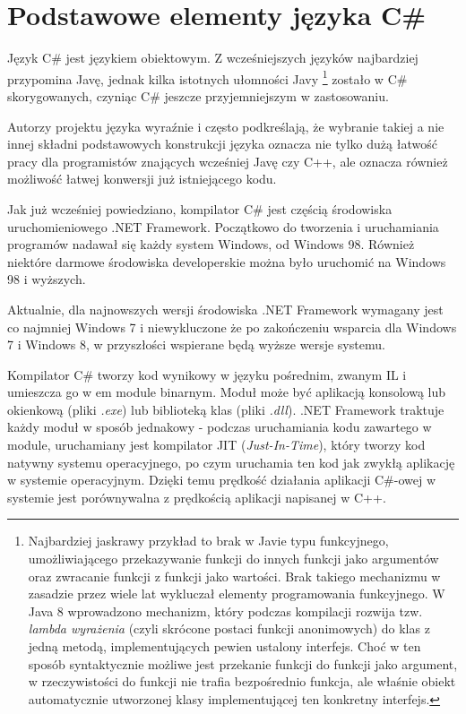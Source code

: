﻿\section{Podstawowe elementy języka C\#}

Język C\# jest językiem obiektowym. Z wcześniejszych języków najbardziej przypomina Javę, jednak
kilka istotnych ułomności Javy
\footnote{Najbardziej jaskrawy przykład to brak w Javie typu funkcyjnego, umożliwiającego przekazywanie
funkcji do innych funkcji jako argumentów oraz zwracanie funkcji z funkcji jako wartości. Brak takiego mechanizmu
w zasadzie przez wiele lat wykluczał elementy programowania funkcyjnego. W Java 8 wprowadzono mechanizm, który
podczas kompilacji rozwija tzw. {\em lambda wyrażenia} (czyli skrócone postaci funkcji anonimowych) do 
klas z jedną metodą, implementujących pewien ustalony interfejs. Choć w ten sposób syntaktycznie możliwe jest przekanie
funkcji do funkcji jako argument, w rzeczywistości do funkcji nie trafia bezpośrednio funkcja, ale właśnie
obiekt automatycznie utworzonej klasy implementującej ten konkretny interfejs.} 
zostało w C\# skorygowanych, czyniąc C\# jeszcze przyjemniejszym w zastosowaniu.

Autorzy projektu języka wyraźnie i często podkreślają, że wybranie takiej a nie innej składni 
podstawowych konstrukcji języka oznacza nie tylko dużą łatwość pracy dla programistów znających 
wcześniej Javę czy C++, ale oznacza również możliwość łatwej konwersji już istniejącego 
kodu.

Jak już wcześniej powiedziano, kompilator C\# jest częścią środowiska uruchomieniowego .NET Framework. 
Początkowo do tworzenia i uruchamiania programów nadawał się każdy system Windows, od Windows 98. Również
niektóre darmowe środowiska developerskie można było uruchomić na Windows 98 i wyższych. 

Aktualnie, dla najnowszych wersji środowiska .NET Framework wymagany jest co najmniej Windows 7 i niewykluczone
że po zakończeniu wsparcia dla Windows 7 i Windows 8, w przyszłości wspierane będą wyższe wersje systemu.

Kompilator C\# tworzy kod wynikowy w języku pośrednim, zwanym IL i umieszcza go
w {em module binarnym}. Moduł może być aplikacją konsolową lub okienkową (pliki {\em *.exe}) lub
biblioteką klas (pliki {\em *.dll}). .NET Framework traktuje każdy moduł w sposób jednakowy - podczas
uruchamiania kodu zawartego w module, uruchamiany jest kompilator JIT ({\em Just-In-Time}), który 
tworzy kod natywny systemu operacyjnego, po czym uruchamia ten kod jak zwykłą aplikację w systemie
operacyjnym. Dzięki temu prędkość działania aplikacji C\#-owej w systemie jest porównywalna
z prędkością aplikacji napisanej w C++. 

